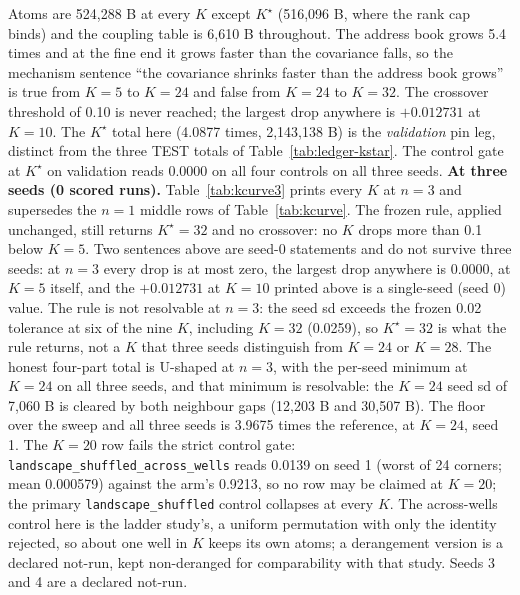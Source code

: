 \documentclass{article} %
\newcommand{\Kstar}{\ensuremath{K^{\star}}}
\begin{document}
\noindent Atoms are 524,288 B at every $K$ except $\Kstar$ (516,096 B, where the rank cap binds) and
the coupling table is 6,610 B throughout. The address book grows 5.4 times and at the fine end it
grows faster than the covariance falls, so the mechanism sentence ``the covariance shrinks faster
than the address book grows'' is true from $K=5$ to $K=24$ and false from $K=24$ to $K=32$. The
crossover threshold of 0.10 is never reached; the largest drop anywhere is $+0.012731$ at $K=10$.
The $\Kstar$ total here (4.0877 times, 2,143,138 B) is the \emph{validation} pin leg, distinct from
the three TEST totals of Table~\ref{tab:ledger-kstar}. %
The control gate at $\Kstar$ on validation reads 0.0000 on all four controls on all three seeds.
\textbf{At three seeds (0 scored runs).} Table~\ref{tab:kcurve3} prints
every $K$ at $n=3$ and supersedes the $n=1$ middle rows of Table~\ref{tab:kcurve}.
The frozen rule, applied unchanged, still returns $\Kstar=32$ and no crossover: no $K$ drops more
than 0.1 below $K=5$. Two sentences above are seed-0 statements and do not survive three seeds: at
$n=3$ every drop is at most zero, the largest drop anywhere is 0.0000, at $K=5$ itself, and the
$+0.012731$ at $K=10$ printed above is a single-seed (seed 0) value. The rule is not resolvable at $n=3$: the seed sd
exceeds the frozen 0.02 tolerance at six of the nine $K$, including $K=32$ (0.0259), so $\Kstar=32$
is what the rule returns, not a $K$ that three seeds distinguish from $K=24$ or $K=28$. The honest
four-part total is U-shaped at $n=3$, with the per-seed minimum at $K=24$ on all three seeds, and
that minimum is resolvable: the $K=24$ seed sd of 7,060 B is cleared by both neighbour gaps (12,203
B and 30,507 B). The floor over the sweep and all three seeds is 3.9675 times the reference, at
$K=24$, seed 1. The $K=20$ row fails the strict control gate:
\texttt{landscape\_shuffled\_across\_wells} reads 0.0139 on seed 1 (worst of 24 corners; mean
0.000579) against the arm's 0.9213, so no row may be claimed at $K=20$; the primary
\texttt{landscape\_shuffled} control collapses at every $K$. The across-wells control here is
the ladder study's, a uniform permutation with only the identity rejected, so about one well in $K$ keeps its
own atoms; a derangement version is a declared not-run, kept non-deranged for comparability with
that study. Seeds 3 and 4 are a declared not-run.
\end{document}
